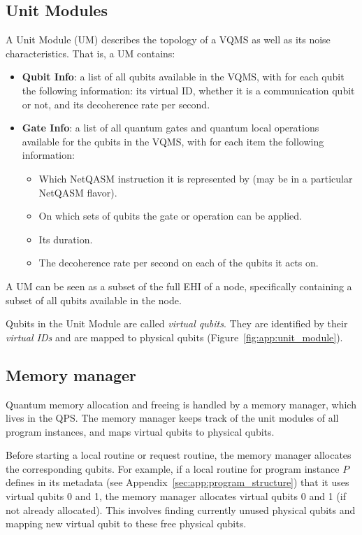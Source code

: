 \subsection{Unit Modules}
A Unit Module (UM) describes the topology of a VQMS as well as its noise characteristics.
That is, a UM contains:
\begin{itemize}
\item \textbf{Qubit Info}: a list of all qubits available in the VQMS, with for each qubit the following information:
its virtual ID,
whether it is a communication qubit or not, and
its decoherence rate per second.

\item \textbf{Gate Info}: a list of all quantum gates and quantum local operations available for the qubits in the VQMS, with for each item the following information:
\begin{itemize}
  \item Which NetQASM instruction it is represented by (may be in a particular NetQASM flavor).
  \item On which sets of qubits the gate or operation can be applied.
  \item Its duration.
  \item The decoherence rate per second on each of the qubits it acts on.
\end{itemize}
\end{itemize}

A UM can be seen as a subset of the full EHI of a node, specifically containing a subset of all qubits available in the node.

Qubits in the Unit Module are called \textit{virtual qubits}. They are identified by their \textit{virtual IDs} and are mapped to physical qubits (Figure~\ref{fig:app:unit_module}).



\subsection{Memory manager}
Quantum memory allocation and freeing is handled by a memory manager, which lives in the QPS.
The memory manager keeps track of the unit modules of all program instances, and maps virtual qubits to physical qubits. 

Before starting a local routine or request routine, the memory manager allocates the corresponding qubits.
For example, if a local routine for program instance $P$ defines in its metadata (see Appendix~\ref{sec:app:program_structure}) that it uses virtual qubits 0 and 1, the memory manager allocates virtual qubits 0 and 1 (if not already allocated).
This involves finding currently unused physical qubits and mapping new virtual qubit to these free physical qubits.

